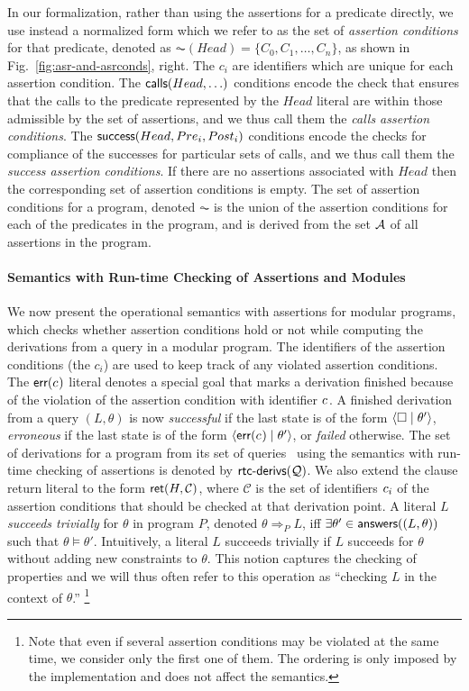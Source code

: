 \documentclass{llncs}
\begin{document}
In our formalization, rather than using the assertions for a predicate
directly, we use instead a normalized form which we refer to as the
set of \emph{assertion conditions} for that predicate, denoted as
$\AC(Head) = \{ C_0, C_1, \ldots , C_n\}$, as shown in
Fig.~\ref{fig:asr-and-asrconds}, right. The $c_i$ are identifiers
which are unique for each assertion condition.
%
The $\textsf{calls}(Head, \ldots)$ conditions encode the check
that ensures that the calls to the predicate represented by the $Head$
literal are within those admissible by the set of assertions, and we
thus call them the \emph{calls assertion conditions}.
%
The $\textsf{success}(Head, Pre_i, Post_i)$ conditions encode
the checks for compliance of the successes for particular sets of calls,
and we thus call them the \emph{success assertion conditions}.
%
If there are no assertions associated with $Head$ then the corresponding
set of assertion conditions is empty.
%
The set of assertion conditions for a program, denoted $\AC$ is the
union of the assertion conditions for each of the predicates in the
program, and is derived from the %
set ${\cal A}$ of all assertions in the program.

\paragraph{Semantics with Run-time Checking of Assertions and Modules}
%
We now present the operational semantics with assertions for modular
programs, which checks whether assertion conditions hold or not while
computing the derivations from a query in a modular program.
%
The identifiers of the assertion conditions (the $c_i$) are used to
keep track of any violated assertion conditions.
%
The $\textsf{err}(c_{})$ literal denotes a special goal that marks a derivation
finished because of the violation of the assertion condition with
identifier $c_{}$.
%
A finished derivation from a query $(L,\theta)$ is now
\emph{successful} if the last state is of the form
$\langle \square \mid{} \theta' \rangle$,
%
\emph{erroneous} if the last state is of the form
$\langle \textsf{err}(c_{}) \mid{} \theta' \rangle$, or
%
\emph{failed} otherwise.
%
The set of derivations for a program from its set of queries \Q\
using the semantics with run-time checking of assertions is denoted
by $\textsf{rtc-derivs}({\cal Q})$.
%
We also extend the clause return literal to the form
$\textsf{ret}(H,\mathcal{C})$, where $\mathcal{C}$ is the set of
identifiers $c_{i}$ of the assertion conditions that should be
checked at that derivation point.
%
A literal $L$ \emph{succeeds trivially} for $\theta$ in program
$P$, denoted $\theta \Rightarrow_P L$, iff $\exists \theta'\in
\textsf{answers}((L,\theta))$ such that $\theta\models\theta'$.
%
Intuitively, a literal $L$ succeeds trivially if $L$ succeeds for $\theta$
without adding new constraints to $\theta$.
%
This notion captures the checking of properties and we will thus often
refer to this operation as ``checking $L$ in the context of
$\theta$.'' \footnote{Note that even if several assertion conditions
  may be violated at the same time, we consider only the first one of
  them. The ordering is only imposed by the implementation and does
  not affect the semantics.}
\end{document}
